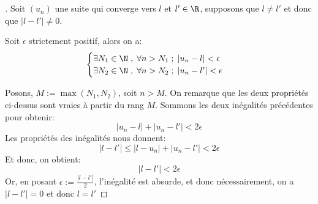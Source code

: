 \section[Demonstrations]{}

\subsection[Unicité de la limite]{}

\begin{proof}[\unskip\nopunct]
   Soit \((u_n)\) une suite qui converge vers \(l\) et \(l' \in \R\), supposons que \(l \neq l'\) et donc que \(|l - l'| \neq 0\).\<
   
   Soit \(\epsilon\) strictement positif, alors on a:
   \[
      \begin{cases}
         \exists N_1 \in \N \; , \; \forall n > N_1 \; ; \; |u_n - l| < \epsilon \\ 
         \exists N_2 \in \N \; , \; \forall n > N_2 \; ; \; |u_n - l'| < \epsilon
      \end{cases} 
   \]
   
   Posons, \(M := \max(N_1, N_2)\), soit \(n > M\). On remarque que les deux propriétés ci-dessus sont vraies à partir du rang \(M\).
   Sommons les deux inégalités précédentes pour obtenir:
   \[
      |u_n - l| + |u_n - l'|< 2\epsilon
   \]
   Les propriétés des inégalités nous donnent:
   \[
      |l - l'| \leq |l - u_n| + |u_n - l'|< 2\epsilon   
   \]
   Et donc, on obtient:
   \[
      |l - l'| < 2\epsilon
   \]
   Or, en posant \(\epsilon := \frac{|l - l'|}{2}\), l'inégalité est absurde, et donc nécessairement, on a \(|l - l'| = 0\) et donc \(l = l'\) 

\end{proof}

